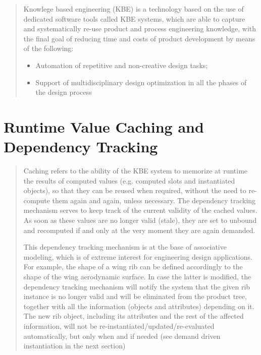 \documentclass [11pt]{book}
\begin{document}
\begin{quote}
Knowlege based engineering (KBE) is a technology based on the
use of dedicated software tools called KBE systems, which are able to
capture and systematically re-use product and process engineering
knowledge, with the final goal of reducing time and costs of product
development by means of the following:

\begin{itemize}

\item Automation of repetitive and non-creative design tasks;

\item Support of multidisciplinary design optimization in all the 
phases of the design process

\end{itemize}



\end{quote}


\section{Runtime Value Caching and Dependency Tracking}

\label{sec:runtimevaluecachinganddependencytracking}



\begin{quote}


Caching refers to the ability of the KBE system to memorize at
runtime the results of computed values (e.g. computed slots and
instantiated objects), so that they can be reused when required,
without the need to re-compute them again and again, unless necessary.
The dependency tracking mechanism serves to keep track of the current
validity of the cached values.  As soon as these values are no longer
valid (stale), they are set to unbound and recomputed if and only at
the very moment they are again demanded.



This dependency tracking mechanism is at the base of associative
modeling, which is of extreme interest for engineering design
applications. For example, the shape of a wing rib can be defined
accordingly to the shape of the wing aerodynamic surface. In case the
latter is modified, the dependency tracking mechanism will notify the
system that the given rib instance is no longer valid and will be
eliminated from the product tree, together with all the
information (objects and attributes) depending on it. The new rib
object, including its attributes and the rest of the affected
information, will not be re-instantiated/updated/re-evaluated
automatically, but only when and if needed (see demand driven
instantiation in the next section)



\end{quote}
\end{document}
